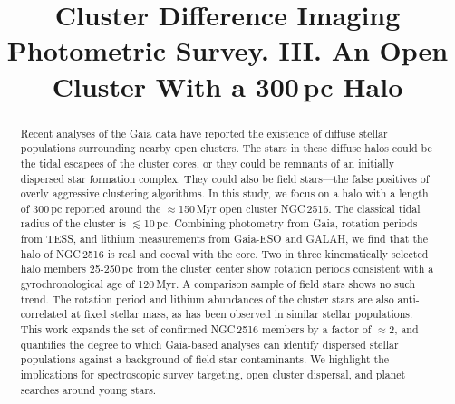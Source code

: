 \documentclass[12pt,twocolumn,tighten]{aastex63}
\begin{document}

\title{
  Cluster Difference Imaging Photometric Survey. III.
  An Open Cluster With a 300\,pc Halo
}



\begin{abstract}
  Recent analyses of the Gaia data have reported the existence of
  diffuse stellar populations surrounding nearby open clusters. 
  The stars in these diffuse halos could be the tidal escapees of the
  cluster cores, or they could be remnants of an initially dispersed
  star formation complex.
  They could also be field stars---the false positives of overly
  aggressive clustering algorithms.
  In this study, we focus on a halo with a length of 300\,pc reported
  around the $\approx$150\,Myr open cluster NGC\,2516.
  The classical tidal radius of the cluster is $\lesssim$10\,pc.
  Combining photometry from Gaia, rotation periods from TESS, and
  lithium measurements from Gaia-ESO and GALAH, we find that the halo
  of NGC\,2516 is real and coeval with the core.
  Two in three kinematically selected halo members 25-250\,pc from the
  cluster center show rotation periods consistent with a
  gyrochronological age of 120\,Myr.
  A comparison sample of field stars shows no such trend.
  The rotation period and lithium abundances of the cluster stars are
  also anti-correlated at fixed stellar mass, as has been observed in
  similar stellar populations.
  This work expands the set of confirmed NGC\,2516 members by a factor
  of $\approx$2, and quantifies the degree to which Gaia-based
  analyses can identify dispersed stellar populations against a
  background of field star contaminants.
  We highlight the implications for spectroscopic survey targeting,
  open cluster dispersal, and planet searches around young stars.
\end{abstract}


\end{document}
